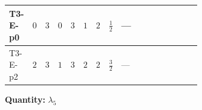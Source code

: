\documentclass[8pt]{article}
\begin{document}
\begin{landscape}
\begin{longtable}{@{}llcccccc >{\raggedright\arraybackslash}p{0.21\linewidth} >{\raggedright\arraybackslash}p{0.21\linewidth} >{\raggedright\arraybackslash}p{0.21\linewidth}@{}}
\midrule
T3-E-p0 & $0$ & $3$ & $0$ & $3$ & $1$ & $2$ & $\frac{1}{2}$ & --- & \scriptsize\adjustbox{max width=\linewidth}{$\begin{gathered} -\frac{33 {g_2}^2 {\lambda_5}}{2}\end{gathered}$} & \scriptsize\adjustbox{max width=\linewidth}{$\begin{gathered} -\frac{9 {g_1}^2 {\lambda_5}}{2}\end{gathered}$} \\
\midrule
T3-E-p2 & $2$ & $3$ & $1$ & $3$ & $2$ & $2$ & $\frac{3}{2}$ & --- & \scriptsize\adjustbox{max width=\linewidth}{$\begin{gathered} -\frac{33 {g_2}^2 {\lambda_5}}{2}\end{gathered}$} & \scriptsize\adjustbox{max width=\linewidth}{$\begin{gathered} -\frac{33 {g_1}^2 {\lambda_5}}{2}\end{gathered}$} \\
\midrule
\bottomrule
\end{longtable}
\clearpage
\noindent\textbf{Quantity: }$\lambda_5$\par\smallskip

\end{landscape}
\end{document}
